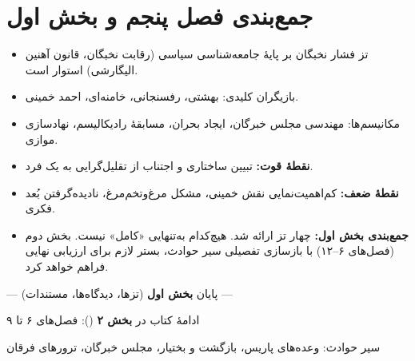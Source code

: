 \documentclass[12pt,a4paper]{book}
\newcommand{\keyword}[1]{\textbf{\textcolor{cPrimary}{#1}}}
\newcommand{\en}[1]{\lr{\textit{#1}}}
\begin{document}
\section{جمع‌بندی فصل پنجم و بخش اول}

\begin{principleBox}
\begin{itemize}[label=\textcolor{cPrimary}{$\blacksquare$}, rightmargin=2em]
    \item تز فشار نخبگان بر پایهٔ جامعه‌شناسی سیاسی (رقابت نخبگان، قانون آهنین الیگارشی) استوار است.
    \item بازیگران کلیدی: بهشتی، رفسنجانی، خامنه‌ای، احمد خمینی.
    \item مکانیسم‌ها: مهندسی مجلس خبرگان، ایجاد بحران، مسابقهٔ رادیکالیسم، نهادسازی موازی.
    \item \keyword{نقطهٔ قوت:} تبیین ساختاری و اجتناب از تقلیل‌گرایی به یک فرد.
    \item \keyword{نقطهٔ ضعف:} کم‌اهمیت‌نمایی نقش خمینی، مشکل مرغ‌وتخم‌مرغ، نادیده‌گرفتن بُعد فکری.
    \item \keyword{جمع‌بندی بخش اول:} چهار تز ارائه شد. هیچ‌کدام به‌تنهایی «کامل» نیست. بخش دوم (فصل‌های ۶–۱۲) با بازسازی تفصیلی سیر حوادث، بستر لازم برای ارزیابی نهایی فراهم خواهد کرد.
\end{itemize}
\end{principleBox}

\vspace{1cm}

\begin{center}

\vspace{0.5cm}
{\small\color{cGray} — پایان \textbf{بخش اول} (تزها، دیدگاه‌ها، مستندات) —}

\vspace{0.3cm}
{\small\color{cGray} ادامهٔ کتاب در \textbf{بخش ۲} (\en{Segment 2}): فصل‌های ۶ تا ۹}

\vspace{0.2cm}
{\small\color{cGray} سیر حوادث: وعده‌های پاریس، بازگشت و بختیار، مجلس خبرگان، ترورهای فرقان}
\end{center}


\end{document}
